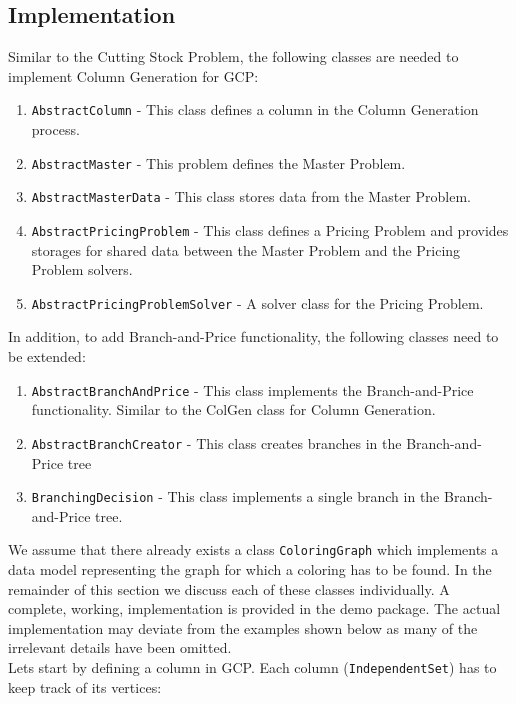 \documentclass[a4paper]{article}
\newcommand{\code}[1]{\lstinline[language=java, style=seminar]!#1!}
\begin{document}
\subsection{Implementation}
Similar to the Cutting Stock Problem, the following classes are needed to implement Column Generation for GCP:
\begin{enumerate}[nolistsep]
 \item \code{AbstractColumn} - This class defines a column in the Column Generation process.
 \item \code{AbstractMaster} - This problem defines the Master Problem.
 \item \code{AbstractMasterData} - This class stores data from the Master Problem.
 \item \code{AbstractPricingProblem} - This class defines a Pricing Problem and provides storages for shared data between the Master Problem and the Pricing Problem solvers.
 \item \code{AbstractPricingProblemSolver} - A solver class for the Pricing Problem.
\end{enumerate}
In addition, to add Branch-and-Price functionality, the following classes need to be extended:
\begin{enumerate}[nolistsep]
 \item \code{AbstractBranchAndPrice} - This class implements the Branch-and-Price functionality. Similar to the ColGen class for Column Generation.
 \item \code{AbstractBranchCreator} - This class creates branches in the Branch-and-Price tree
 \item \code{BranchingDecision} - This class implements a single branch in the Branch-and-Price tree.
\end{enumerate}
We assume that there already exists a class \code{ColoringGraph} which implements a data model representing the graph for which a coloring has to be found.
In the remainder of this section we discuss each of these classes individually. A complete, working, implementation is provided in the demo package. The actual implementation may deviate from the examples shown below as many of the irrelevant details have been omitted.\\
Lets start by defining a column in GCP. Each column (\code{IndependentSet}) has to keep track of its vertices:
\end{document}
